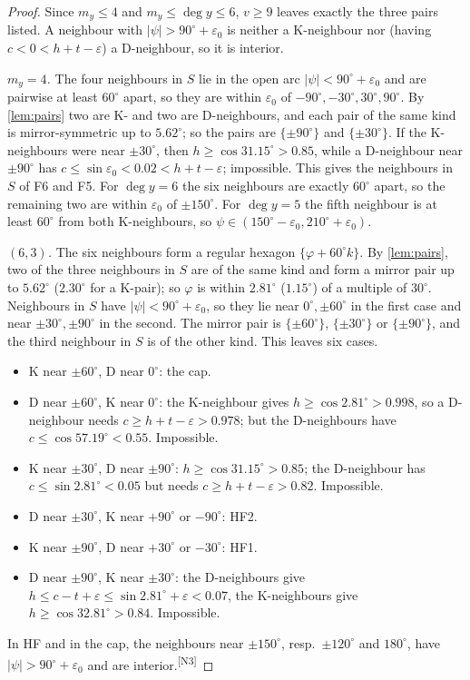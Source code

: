 \documentclass[11pt]{amsart}
\theoremstyle{definition}
\theoremstyle{remark}
\newcommand{\eps}{\varepsilon}
\newcommand{\chk}[1]{\textsuperscript{[#1]}}
\begin{document}
\begin{proof}
Since $m_y\le4$ and $m_y\le\deg y\le6$, $v\ge9$ leaves exactly the three pairs listed. A neighbour with $|\psi|>90^\circ+\eps_0$ is neither a K-neighbour nor (having $c<0<h+t-\eps$) a D-neighbour, so it is interior.

\emph{$m_y=4$.} The four neighbours in $S$ lie in the open arc $|\psi|<90^\circ+\eps_0$ and are pairwise at least $60^\circ$ apart, so they are within $\eps_0$ of $-90^\circ,-30^\circ,30^\circ,90^\circ$. By \cref{lem:pairs} two are K- and two are D-neighbours, and each pair of the same kind is mirror-symmetric up to $5.62^\circ$; so the pairs are $\{\pm90^\circ\}$ and $\{\pm30^\circ\}$. If the K-neighbours were near $\pm30^\circ$, then $h\ge\cos31.15^\circ>0.85$, while a D-neighbour near $\pm90^\circ$ has $c\le\sin\eps_0<0.02<h+t-\eps$; impossible. This gives the neighbours in $S$ of F6 and F5. For $\deg y=6$ the six neighbours are exactly $60^\circ$ apart, so the remaining two are within $\eps_0$ of $\pm150^\circ$. For $\deg y=5$ the fifth neighbour is at least $60^\circ$ from both K-neighbours, so $\psi\in(150^\circ-\eps_0,210^\circ+\eps_0)$.

\emph{$(6,3)$.} The six neighbours form a regular hexagon $\{\varphi+60^\circ k\}$. By \cref{lem:pairs}, two of the three neighbours in $S$ are of the same kind and form a mirror pair up to $5.62^\circ$ ($2.30^\circ$ for a K-pair); so $\varphi$ is within $2.81^\circ$ ($1.15^\circ$) of a multiple of $30^\circ$. Neighbours in $S$ have $|\psi|<90^\circ+\eps_0$, so they lie near $0^\circ,\pm60^\circ$ in the first case and near $\pm30^\circ,\pm90^\circ$ in the second. The mirror pair is $\{\pm60^\circ\}$, $\{\pm30^\circ\}$ or $\{\pm90^\circ\}$, and the third neighbour in $S$ is of the other kind. This leaves six cases.
\begin{itemize}[leftmargin=2em]
\item K near $\pm60^\circ$, D near $0^\circ$: the cap.
\item D near $\pm60^\circ$, K near $0^\circ$: the K-neighbour gives $h\ge\cos2.81^\circ>0.998$, so a D-neighbour needs $c\ge h+t-\eps>0.978$; but the D-neighbours have $c\le\cos57.19^\circ<0.55$. Impossible.
\item K near $\pm30^\circ$, D near $\pm90^\circ$: $h\ge\cos31.15^\circ>0.85$; the D-neighbour has $c\le\sin2.81^\circ<0.05$ but needs $c\ge h+t-\eps>0.82$. Impossible.
\item D near $\pm30^\circ$, K near $+90^\circ$ or $-90^\circ$: HF2.
\item K near $\pm90^\circ$, D near $+30^\circ$ or $-30^\circ$: HF1.
\item D near $\pm90^\circ$, K near $\pm30^\circ$: the D-neighbours give $h\le c-t+\eps\le\sin2.81^\circ+\eps<0.07$, the K-neighbours give $h\ge\cos32.81^\circ>0.84$. Impossible.
\end{itemize}
In HF and in the cap, the neighbours near $\pm150^\circ$, resp.\ $\pm120^\circ$ and $180^\circ$, have $|\psi|>90^\circ+\eps_0$ and are interior.\chk{N3}
\end{proof}
\end{document}
